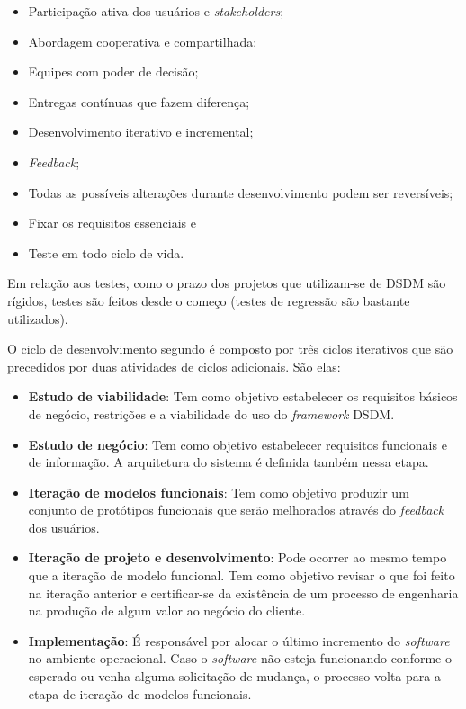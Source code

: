 \begin{itemize}
	\item Participação ativa dos usuários e \textit{stakeholders};
	\item Abordagem cooperativa e compartilhada;
	\item Equipes com poder de decisão;
	\item Entregas contínuas que fazem diferença;
	\item Desenvolvimento iterativo e incremental;
	\item \textit{Feedback};
	\item Todas as possíveis alterações durante desenvolvimento podem ser reversíveis;
	\item Fixar os requisitos essenciais e
	\item Teste em todo ciclo de vida.
\end{itemize}

Em relação aos testes, como o prazo dos projetos que utilizam-se de DSDM são rígidos, testes são feitos desde o começo (testes de regressão são bastante utilizados). \cite{macedo:12}

O ciclo de desenvolvimento segundo  é composto por três ciclos iterativos que são precedidos por duas atividades de ciclos adicionais. São elas:

\begin{itemize}
	\item \textbf{Estudo de viabilidade}: Tem como objetivo estabelecer os requisitos básicos de negócio, restrições e a viabilidade do uso do \textit{framework} DSDM.
	\item \textbf{Estudo de negócio}: Tem como objetivo estabelecer requisitos funcionais e de informação. A arquitetura do sistema é definida também nessa etapa.
	\item \textbf{Iteração de modelos funcionais}: Tem como objetivo produzir um conjunto de protótipos funcionais que serão melhorados através do \textit{feedback} dos usuários.
	\item \textbf{Iteração de projeto e desenvolvimento}: Pode ocorrer ao mesmo tempo que a iteração de modelo funcional. Tem como objetivo revisar o que foi feito na iteração anterior e certificar-se da existência de um processo de engenharia na produção de algum valor ao negócio do cliente. 
	\item \textbf{Implementação}: É responsável por alocar o último incremento do \textit{software} no ambiente operacional. Caso o \textit{software} não esteja funcionando conforme o esperado ou venha alguma solicitação de mudança, o processo volta para a etapa de iteração de modelos funcionais.
\end{itemize}

